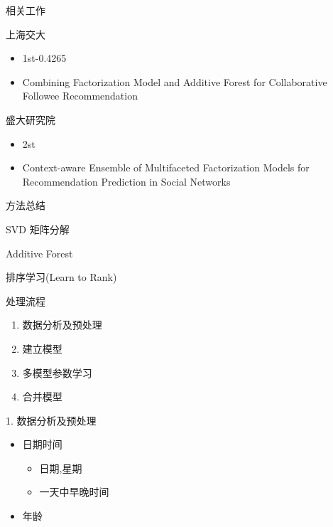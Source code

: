 \documentclass{beamer}
\begin{document}
\begin{frame}{相关工作}
    \begin{block}{上海交大}
        \begin{itemize}
        \item 1st-0.4265
        \item Combining Factorization Model and Additive Forest for Collaborative Followee Recommendation
        \end{itemize}
    \end{block}

    \begin{block}{盛大研究院}
        \begin{itemize}
        \item 2st 
        \item Context-aware Ensemble of Multifaceted Factorization Models for Recommendation Prediction in Social Networks
        \end{itemize}
    \end{block}
\end{frame}

\begin{frame}{方法总结}
    \begin{block}{SVD 矩阵分解}
    \end{block}
    
    \begin{block}{Additive Forest}
    \end{block}

    \begin{block}{排序学习(Learn to Rank)}
    \end{block}
\end{frame}

\begin{frame}{处理流程}
    \begin{enumerate}
    \item 数据分析及预处理
    \item 建立模型
    \item 多模型参数学习
    \item 合并模型
    \end{enumerate}
\end{frame}
\begin{frame}{1. 数据分析及预处理}
    \begin{itemize}
    \item 日期时间
        \begin{itemize}
        \item 日期,星期
        \item 一天中早晚时间
        \end{itemize}
    \item 年龄
    \end{itemize}
\end{frame}
\end{document}
